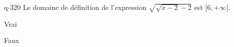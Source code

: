 \begin{truefalse}{q-320}
Le domaine de définition de l'expression $\sqrt{\sqrt{x-2}-2}$ est $[6,+\infty[$.
\item* Vrai
\item Faux
\end{truefalse}

